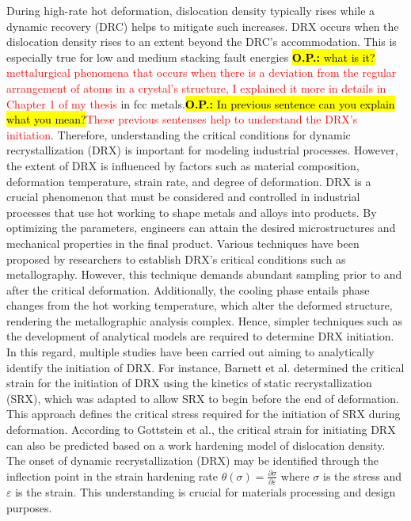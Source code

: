 \documentclass[metals,article,submit,pdftex,moreauthors]{Definitions/mdpi}
\makeatletter
\DeclareRobustCommand{\eal}{et al.\@\xspace}
\DeclareRobustCommand{\OP}[1]{\begingroup\sethlcolor{VWyellow}\textcolor{red}{\hl{\textbf{O.P.:} #1}}\endgroup}
\DeclareRobustCommand{\OPP}[1]{\begingroup\sethlcolor{VWyellow}\textcolor{red}{\hl{\textbf{O.P.:} In previous sentence #1}}\endgroup}
\makeatother
\begin{document}
During high-rate hot deformation, dislocation density typically rises while a dynamic recovery (DRC) helps to mitigate such increases.
DRX occurs when the dislocation density rises to an extent beyond the DRC’s accommodation.
This is especially true for low and medium stacking fault energies \OP{what is it?} \textcolor{red}{mettalurgical phenomena that occurs when there is a deviation from the regular arrangement of atoms in a crystal's structure, I explained it more in details in Chapter 1 of my thesis} in fcc metals.\OPP{can you explain what you mean?}\textcolor{red}{These previous sentenses help to understand the DRX's initiation}.
Therefore, understanding the critical conditions for dynamic recrystallization (DRX) is important for modeling industrial processes.
However, the extent of DRX is influenced by factors such as material composition, deformation temperature, strain rate, and degree of deformation.
DRX is a crucial phenomenon that must be considered and controlled in industrial processes that use hot working to shape metals and alloys into products.
By optimizing the parameters, engineers can attain the desired microstructures and mechanical properties in the final product.
Various techniques have been proposed by researchers to establish DRX's critical conditions such as metallography.
However, this technique demands abundant sampling prior to and after the critical deformation.
Additionally, the cooling phase entails phase changes from the hot working temperature, which alter the deformed structure, rendering the metallographic analysis complex.
Hence, simpler techniques such as the development of analytical models are required to determine DRX initiation.
In this regard, multiple studies have been carried out aiming to analytically identify the initiation of DRX.
For instance, Barnett \eal \cite{barnett2000predicting} determined the critical strain for the initiation of DRX using the kinetics of static recrystallization (SRX), which was adapted to allow SRX to begin before the end of deformation.
This approach defines the critical stress required for the initiation of SRX during deformation.
According to Gottstein \eal \cite{gottstein2004prediction}, the critical strain for initiating DRX can also be predicted based on a work hardening model of dislocation density.
The onset of dynamic recrystallization (DRX) may be identified through the inflection point in the strain hardening rate $\theta(\sigma)=\frac{\partial \sigma}{\partial \varepsilon}$ where $\sigma$ is the stress and $\varepsilon$ is the strain.
This understanding is crucial for materials processing and design purposes.
\end{document}
